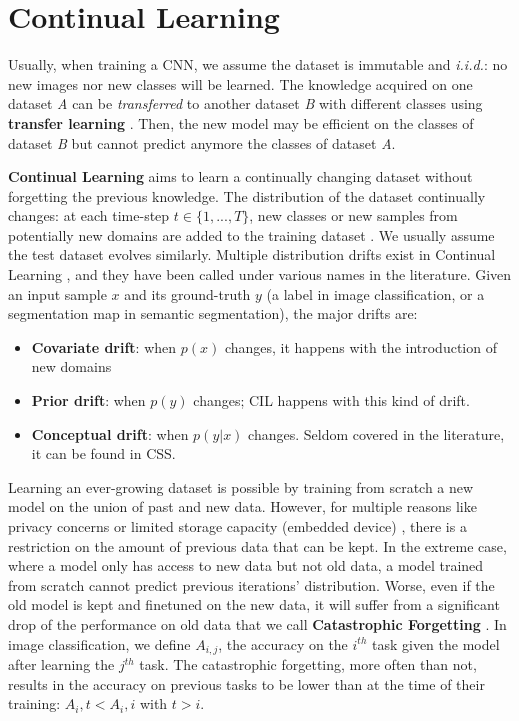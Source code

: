 \section{Continual Learning}
\label{sec:related_continual}

Usually, when training a \ac{CNN}, we assume the dataset is immutable and \textit{i.i.d.}: no new
images nor new classes will be learned. The knowledge acquired on one dataset \textit{A} can be
\textit{transferred} to another dataset \textit{B} with different classes using \textbf{transfer learning}
\citep{razavian2014transferlearning}. Then, the new model may be efficient on
the classes of dataset \textit{B} but cannot predict anymore the classes of dataset \textit{A}.

\textbf{Continual Learning} aims to learn a continually changing dataset without forgetting the
previous knowledge. The distribution of the dataset continually changes: \eg at each time-step $t
      \in \{1, ..., T \}$, new
classes or new samples from potentially new domains are added to the training dataset
\citep{lomonaco2017core50}. We usually assume the test dataset evolves similarly. Multiple
distribution drifts exist in Continual Learning
\citep{morenotorresa2012datasetshift,lesort2021driftanalysis}, and they have been called under
various names in the literature. Given an input sample $x$ and its ground-truth $y$ (a label in
image classification, or a segmentation map in semantic segmentation), the major drifts are:

\begin{itemize}
      \item \textbf{Covariate drift}: when $p(x)$ changes, it happens with the introduction of new
            domains \citep{volpi2021continualdomainadapt}
      \item \textbf{Prior drift}: when $p(y)$ changes; \ac{CIL} happens with this kind of drift.
      \item \textbf{Conceptual drift}: when $p(y | x)$ changes. Seldom covered in the literature, it
            can be found in \acf{CSS}.
\end{itemize}

Learning an ever-growing dataset is possible by training from scratch a new model on the union of
past and new data. However, for multiple reasons like privacy concerns or limited storage capacity
(embedded device) \citep{vasquez2017incrementalneuralforest}, there is a restriction on the amount
of previous data that can be kept. In the extreme case, where a model only has access to new data
but not old data, a model trained from scratch cannot predict previous iterations' distribution.
Worse, even if the old model is kept and finetuned on the new data, it will suffer from a
significant drop of the performance on old data that we call \textbf{Catastrophic Forgetting}
\citep{robins1995catastrophicforgetting}. In image classification, we define $A_{i,j}$, the accuracy
on the $i^{th}$ task given the model after learning the $j^{th}$ task. The catastrophic forgetting,
more often than not, results in the accuracy on previous tasks to be lower than at the time of their
training: $A_i,t < A_i,i$ with $t > i$.

